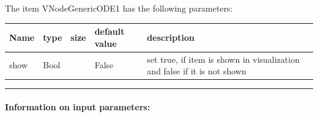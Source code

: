\noindent The item VNodeGenericODE1 has the following parameters:
\begin{center}
  \footnotesize
  \begin{longtable}{| p{4.5cm} | p{2.5cm} | p{0.5cm} | p{2.5cm} | p{6cm} |}
    \hline
    \bf Name & \bf type & \bf size & \bf default value & \bf description \\ \hline
    show &     Bool &      &     False &     set true, if item is shown in visualization and false if it is not shown\\ \hline
\end{longtable}
\end{center}
\par\noindent\rule{\textwidth}{0.4pt}
\label{description_NodeGenericODE1}
\paragraph{Information on input parameters:} 
\finishTable

